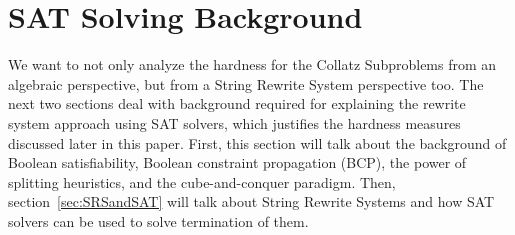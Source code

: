 \documentclass[12pt]{article}
\theoremstyle{definition}
\begin{document}
\section{SAT Solving Background} \label{sec:SATsolving}
We want to not only analyze the hardness for the Collatz Subproblems from an algebraic perspective, but from a String Rewrite System perspective too. The next two sections deal with background required for explaining the rewrite system approach using SAT solvers, which justifies the hardness measures discussed later in this paper. First, this section will talk about the background of Boolean satisfiability, Boolean constraint propagation (BCP), the power of splitting heuristics, and the cube-and-conquer paradigm. Then, section~\ref{sec:SRSandSAT} will talk about String Rewrite Systems and how SAT solvers can be used to solve termination of them.
\end{document}
